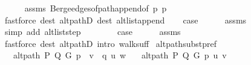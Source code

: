 \begin{isabellebody}
\ \ \ \ \isamarkupfalse%
\ assms{\isacharparenleft}{\kern0pt}{}{\isacharparenright}{\kern0pt}\ Berge{\isachardot}{\kern0pt}edges{\isacharunderscore}{\kern0pt}of{\isacharunderscore}{\kern0pt}path{\isacharunderscore}{\kern0pt}append{\isacharbrackleft}{\kern0pt}of\ p\ {\isacharquery}{\kern0pt}p{\isacharprime}{\kern0pt}{\isacharbrackright}{\kern0pt}\isanewline
\ \ \ \ \isamarkupfalse%
\ {\isacharparenleft}{\kern0pt}fastforce\ dest{\isacharcolon}{\kern0pt}\ alt{\isacharunderscore}{\kern0pt}pathD{\isacharparenleft}{\kern0pt}{}{\isacharparenright}{\kern0pt}\ dest{\isacharcolon}{\kern0pt}\ alt{\isacharunderscore}{\kern0pt}list{\isacharunderscore}{\kern0pt}append{\isacharunderscore}{\kern0pt}{}{\isacharparenright}{\kern0pt}\isanewline
\ \ \isamarkupfalse%
\ {\isacharquery}{\kern0pt}case\isanewline
\ \ \ \ \isamarkupfalse%
\ assms{\isacharparenleft}{\kern0pt}{}{\isacharparenright}{\kern0pt}\isanewline
\ \ \ \ \isamarkupfalse%
\ {\isacharparenleft}{\kern0pt}simp\ add{\isacharcolon}{\kern0pt}\ alt{\isacharunderscore}{\kern0pt}list{\isacharunderscore}{\kern0pt}step{\isacharparenright}{\kern0pt}\isanewline
{}\isamarkupfalse%
\isanewline
\ \ \isamarkupfalse%
\ {}\isanewline
\ \ \isamarkupfalse%
\ {\isacharquery}{\kern0pt}case\isanewline
\ \ \ \ \isamarkupfalse%
\ assms{\isacharparenleft}{\kern0pt}{}{\isacharparenright}{\kern0pt}\isanewline
\ \ \ \ \isamarkupfalse%
\ {\isacharparenleft}{\kern0pt}fastforce\ dest{\isacharcolon}{\kern0pt}\ alt{\isacharunderscore}{\kern0pt}pathD{\isacharparenleft}{\kern0pt}{}{\isacharparenright}{\kern0pt}\ intro{\isacharcolon}{\kern0pt}\ walk{\isacharunderscore}{\kern0pt}suff{\isacharparenright}{\kern0pt}\isanewline
{}\isamarkupfalse%
%
\endisatagproof
{\isafoldproof}%
%
\isadelimproof
\isanewline
%
\endisadelimproof
\isanewline
{}\isamarkupfalse%
\ alt{\isacharunderscore}{\kern0pt}path{\isacharunderscore}{\kern0pt}subst{\isacharunderscore}{\kern0pt}pref{\isacharcolon}{\kern0pt}\isanewline
\ \ \ {\isachardoublequoteopen}alt{\isacharunderscore}{\kern0pt}path\ P\ Q\ G\ {\isacharparenleft}{\kern0pt}p\ {\isacharat}{\kern0pt}\ v\ {\isacharhash}{\kern0pt}\ q{\isacharparenright}{\kern0pt}\ u\ w{\isachardoublequoteclose}\isanewline
\ \ \ {\isachardoublequoteopen}alt{\isacharunderscore}{\kern0pt}path\ P\ Q\ G\ p{\isacharprime}{\kern0pt}\ u\ v{\isachardoublequoteclose}\isanewline

\end{isabellebody}
